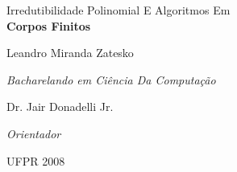 \documentclass{article}
\newcommand{\veryHuge}{\fontsize{33.18}{41.12}\selectfont}
\begin{document}
\pagestyle{empty}


\hrulefill

\noindent
\begin{center}
  \LARGE Irredutibilidade Polinomial E Algoritmos Em\\
  \veryHuge\bfseries Corpos Finitos
\end{center}

\hrulefill


\begin{center}
  \Large\mdseries Leandro Miranda Zatesko

  \vspace{0.25\baselineskip}

  \normalsize\slshape Bacharelando em Ciência Da Computação


  \Large\upshape Dr. Jair Donadelli Jr.

  \vspace{0.25\baselineskip}

  \normalsize\slshape Orientador
\end{center}


\begin{center}
  \Large\sffamily UFPR 2008
\end{center}

\newpage
\thispagestyle{empty}
\mbox{}
\end{document}
